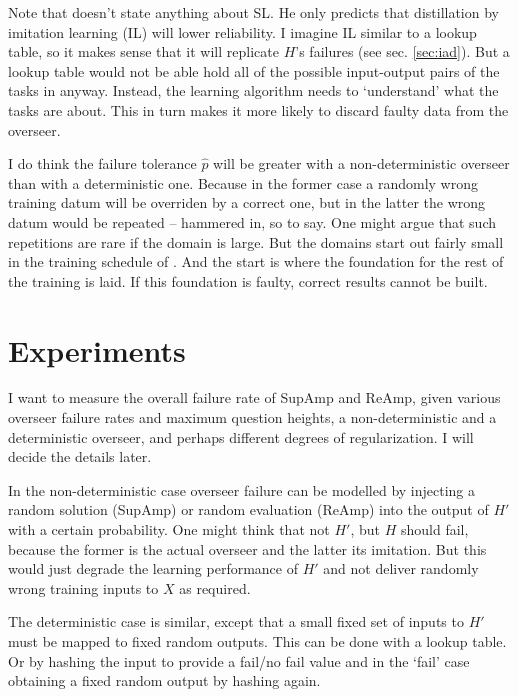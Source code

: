 \documentclass{farlamp}
\begin{document}
Note that \textcite{ChriRelAmp} doesn't state anything about SL. He only
predicts that distillation by imitation learning (IL) will lower reliability. I
imagine IL similar to a lookup table, so it makes sense that it will replicate
$H$'s failures (see sec. \ref{sec:iad}). But a lookup table would not be able
hold all of the possible input-output pairs of the tasks in \textcite{CSASupAmp}
anyway. Instead, the learning algorithm needs to ‘understand’ what the tasks are
about. This in turn makes it more likely to discard faulty data from the
overseer.

I do think the failure tolerance $\hat{p}$ will be greater with a
non-deterministic overseer than with a deterministic one. Because in the former
case a randomly wrong training datum will be overriden by a correct one, but in
the latter the wrong datum would be repeated – hammered in, so to say. One might
argue that such repetitions are rare if the domain is large. But the domains
start out fairly small in the training schedule of \textcite{CSASupAmp}. And the
start is where the foundation for the rest of the training is laid. If this
foundation is faulty, correct results cannot be built.


\section{Experiments}

I want to measure the overall failure rate of SupAmp and ReAmp, given various
overseer failure rates and maximum question heights, a non-deterministic and a
deterministic overseer, and perhaps different degrees of regularization. I will
decide the details later.

In the non-deterministic case overseer failure can be modelled by injecting a
random solution (SupAmp) or random evaluation (ReAmp) into the output of $H'$
with a certain probability. One might think that not $H'$, but $H$ should fail,
because the former is the actual overseer and the latter its imitation. But this
would just degrade the learning performance of $H'$ and not deliver randomly
wrong training inputs to $X$ as required.

The deterministic case is similar, except that a small fixed set of inputs to
$H'$ must be mapped to fixed random outputs. This can be done with a lookup
table. Or by hashing the input to provide a fail/no fail value and in the ‘fail’
case obtaining a fixed random output by hashing again.


\begin{FlushLeft}
\printbibliography
\end{FlushLeft}
\end{document}
